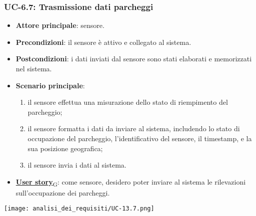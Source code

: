 \subsubsection{UC-6.7: Trasmissione dati parcheggi}
\begin{itemize}
	\item \textbf{Attore principale}: sensore.
	\item \textbf{Precondizioni}: il sensore è attivo e collegato al sistema.
	\item \textbf{Postcondizioni}: i dati inviati dal sensore sono stati elaborati e memorizzati nel sistema.
	\item \textbf{Scenario principale}:
	      \begin{enumerate}
		      \item il sensore effettua una misurazione dello stato di riempimento del parcheggio;
		      \item il sensore formatta i dati da inviare al sistema, includendo lo stato di occupazione del parcheggio, l'identificativo del sensore,
		            il timestamp, e la sua posizione geografica;
		      \item il sensore invia i dati al sistema.
	      \end{enumerate}
	\item \href{https://7last.github.io/docs/pb/documentazione-interna/glossario\#user-story}{\textbf{User story}\textsubscript{G}}:
	      come sensore, desidero poter inviare al sistema le rilevazioni sull'occupazione dei parcheggi.
\end{itemize}

\begin{center}
	\texttt{[image: analisi\_dei\_requisiti/UC-13.7.png]}
\end{center}

